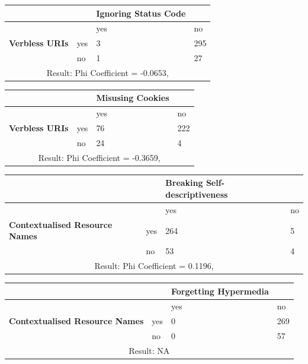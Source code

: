 \documentclass[a4paper,12pt]{article}
\begin{document}
\begin{center}
  \begin{tabular}{| p{60mm} | p{10mm} | p{35mm} | p{35mm} |}
  \hline
   & & \textbf{Ignoring Status Code} &
  \\
  \hline
  & & yes & no
  \\
  \hline
  \textbf{Verbless URIs} & yes & 3 & 295
  \\
  \hline
   & no & 1 & 27
  \\
  \hline
  \multicolumn{4}{|c|}{Result: Phi Coefficient = -0.0653, }
  \\ \hline
  \end{tabular}
  \end{center}

\begin{center}
  \begin{tabular}{| p{60mm} | p{10mm} | p{35mm} | p{35mm} |}
  \hline
   & & \textbf{Misusing Cookies} &
  \\
  \hline
  & & yes & no
  \\
  \hline
  \textbf{Verbless URIs} & yes & 76 & 222
  \\
  \hline
   & no & 24 & 4
  \\
  \hline
  \multicolumn{4}{|c|}{Result: Phi Coefficient = -0.3659, }
  \\ \hline
  \end{tabular}
  \end{center}

\begin{center}
  \begin{tabular}{| p{60mm} | p{10mm} | p{35mm} | p{35mm} |}
  \hline
   & & \textbf{Breaking Self-descriptiveness} &
  \\
  \hline
  & & yes & no
  \\
  \hline
  \textbf{Contextualised Resource Names} & yes & 264 & 5
  \\
  \hline
   & no & 53 & 4
  \\
  \hline
  \multicolumn{4}{|c|}{Result: Phi Coefficient = 0.1196, }
  \\ \hline
  \end{tabular}
  \end{center}

\begin{center}
  \begin{tabular}{| p{60mm} | p{10mm} | p{35mm} | p{35mm} |}
  \hline
   & & \textbf{Forgetting Hypermedia} &
  \\
  \hline
  & & yes & no
  \\
  \hline
  \textbf{Contextualised Resource Names} & yes & 0 & 269
  \\
  \hline
   & no & 0 & 57
  \\
  \hline
  \multicolumn{4}{|c|}{Result: NA}
  \\ \hline
  \end{tabular}
  \end{center}
\end{document}

